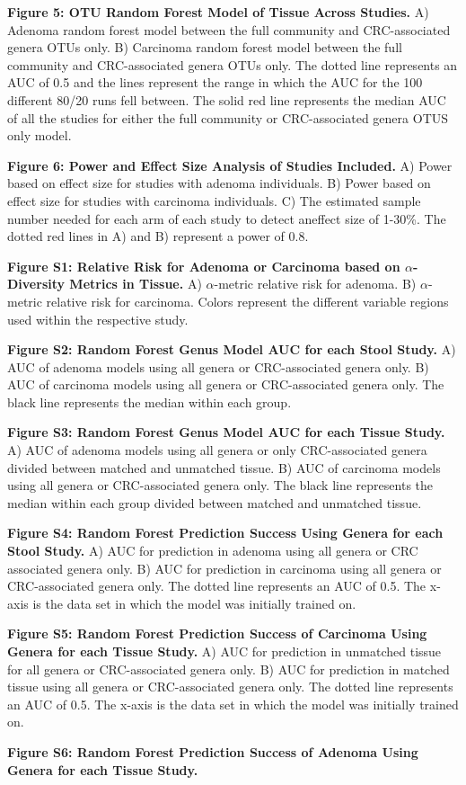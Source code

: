 \documentclass[12pt,]{article}
\begin{document}
\textbf{Figure 5: OTU Random Forest Model of Tissue Across Studies.} A)
Adenoma random forest model between the full community and
CRC-associated genera OTUs only. B) Carcinoma random forest model
between the full community and CRC-associated genera OTUs only. The
dotted line represents an AUC of 0.5 and the lines represent the range
in which the AUC for the 100 different 80/20 runs fell between. The
solid red line represents the median AUC of all the studies for either
the full community or CRC-associated genera OTUS only model.

\textbf{Figure 6: Power and Effect Size Analysis of Studies Included.}
A) Power based on effect size for studies with adenoma individuals. B)
Power based on effect size for studies with carcinoma individuals. C)
The estimated sample number needed for each arm of each study to detect
aneffect size of 1-30\%. The dotted red lines in A) and B) represent a
power of 0.8.

\newpage

\textbf{Figure S1: Relative Risk for Adenoma or Carcinoma based on
\(\alpha\)-Diversity Metrics in Tissue.} A) \(\alpha\)-metric relative
risk for adenoma. B) \(\alpha\)-metric relative risk for carcinoma.
Colors represent the different variable regions used within the
respective study.

\textbf{Figure S2: Random Forest Genus Model AUC for each Stool Study.}
A) AUC of adenoma models using all genera or CRC-associated genera only.
B) AUC of carcinoma models using all genera or CRC-associated genera
only. The black line represents the median within each group.

\textbf{Figure S3: Random Forest Genus Model AUC for each Tissue Study.}
A) AUC of adenoma models using all genera or only CRC-associated genera
divided between matched and unmatched tissue. B) AUC of carcinoma models
using all genera or CRC-associated genera only. The black line
represents the median within each group divided between matched and
unmatched tissue.

\textbf{Figure S4: Random Forest Prediction Success Using Genera for
each Stool Study.} A) AUC for prediction in adenoma using all genera or
CRC associated genera only. B) AUC for prediction in carcinoma using all
genera or CRC-associated genera only. The dotted line represents an AUC
of 0.5. The x-axis is the data set in which the model was initially
trained on.

\textbf{Figure S5: Random Forest Prediction Success of Carcinoma Using
Genera for each Tissue Study.} A) AUC for prediction in unmatched tissue
for all genera or CRC-associated genera only. B) AUC for prediction in
matched tissue using all genera or CRC-associated genera only. The
dotted line represents an AUC of 0.5. The x-axis is the data set in
which the model was initially trained on.

\textbf{Figure S6: Random Forest Prediction Success of Adenoma Using
Genera for each Tissue Study.}

\newpage
\end{document}
